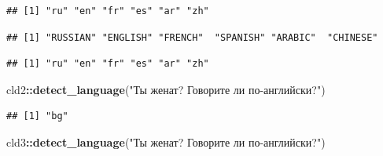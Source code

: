 \documentclass[
]{book}
\newenvironment{Shaded}{\begin{snugshade}}{\end{snugshade}}
\newcommand{\DataTypeTok}[1]{\textcolor[rgb]{0.13,0.29,0.53}{#1}}
\newcommand{\DecValTok}[1]{\textcolor[rgb]{0.00,0.00,0.81}{#1}}
\newcommand{\KeywordTok}[1]{\textcolor[rgb]{0.13,0.29,0.53}{\textbf{#1}}}
\newcommand{\NormalTok}[1]{#1}
\newcommand{\OperatorTok}[1]{\textcolor[rgb]{0.81,0.36,0.00}{\textbf{#1}}}
\newcommand{\OtherTok}[1]{\textcolor[rgb]{0.56,0.35,0.01}{#1}}
\newcommand{\StringTok}[1]{\textcolor[rgb]{0.31,0.60,0.02}{#1}}
\begin{document}
\begin{Shaded}
\end{Shaded}

\begin{verbatim}
## [1] "ru" "en" "fr" "es" "ar" "zh"
\end{verbatim}

\begin{Shaded}
\end{Shaded}

\begin{verbatim}
## [1] "RUSSIAN" "ENGLISH" "FRENCH"  "SPANISH" "ARABIC"  "CHINESE"
\end{verbatim}

\begin{Shaded}
\end{Shaded}

\begin{verbatim}
## [1] "ru" "en" "fr" "es" "ar" "zh"
\end{verbatim}

\begin{Shaded}
\begin{Highlighting}[]
\NormalTok{cld2}\OperatorTok{::}\KeywordTok{detect_language}\NormalTok{(}\StringTok{"Ты женат? Говорите ли по-английски?"}\NormalTok{)}
\end{Highlighting}
\end{Shaded}

\begin{verbatim}
## [1] "bg"
\end{verbatim}

\begin{Shaded}
\begin{Highlighting}[]
\NormalTok{cld3}\OperatorTok{::}\KeywordTok{detect_language}\NormalTok{(}\StringTok{"Ты женат? Говорите ли по-английски?"}\NormalTok{)}
\end{Highlighting}
\end{Shaded}
\end{document}
